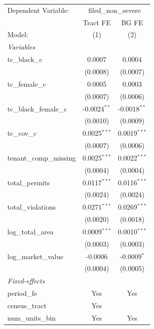 \begin{tabular}{lcc}
   \tabularnewline \midrule \midrule
   Dependent Variable: & \multicolumn{2}{c}{filed\_non\_severe}\\
                           & Tract FE       & BG FE \\   
   Model:                  & (1)            & (2)\\  
   \midrule
   \emph{Variables}\\
   tc\_black\_c            & 0.0007         & 0.0004\\   
                           & (0.0008)       & (0.0007)\\   
   tc\_female\_c           & 0.0005         & 0.0003\\   
                           & (0.0007)       & (0.0006)\\   
   tc\_black\_female\_c    & -0.0024$^{**}$ & -0.0018$^{**}$\\   
                           & (0.0010)       & (0.0009)\\   
   tc\_cov\_c              & 0.0025$^{***}$ & 0.0019$^{***}$\\   
                           & (0.0007)       & (0.0006)\\   
   tenant\_comp\_missing   & 0.0025$^{***}$ & 0.0022$^{***}$\\   
                           & (0.0004)       & (0.0004)\\   
   total\_permits          & 0.0117$^{***}$ & 0.0116$^{***}$\\   
                           & (0.0024)       & (0.0024)\\   
   total\_violations       & 0.0271$^{***}$ & 0.0269$^{***}$\\   
                           & (0.0020)       & (0.0018)\\   
   log\_total\_area        & 0.0009$^{***}$ & 0.0010$^{***}$\\   
                           & (0.0003)       & (0.0003)\\   
   log\_market\_value      & -0.0006        & -0.0009$^{*}$\\   
                           & (0.0004)       & (0.0005)\\   
   \midrule
   \emph{Fixed-effects}\\
   period\_fe              & Yes            & Yes\\  
   census\_tract           & Yes            & \\  
   num\_units\_bin         & Yes            & Yes\\  

\end{tabular}
